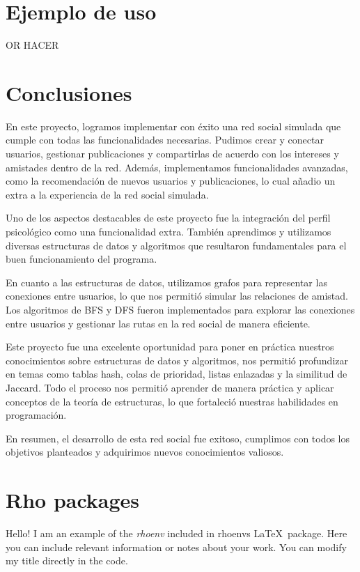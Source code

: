 \documentclass[9pt,letterpaper,onecolumn]{rho-class/rho}
\begin{document}
\newpage
\section{Ejemplo de uso}

    OR HACER

\newpage
\section{Conclusiones}

    En este proyecto, logramos implementar con éxito una red social simulada que cumple con todas las funcionalidades necesarias. Pudimos crear y conectar usuarios, gestionar publicaciones y compartirlas de acuerdo con los intereses y amistades dentro de la red. Además, implementamos funcionalidades avanzadas, como la recomendación de nuevos usuarios y publicaciones, lo cual añadio un extra a la experiencia de la red social simulada.

    Uno de los aspectos destacables de este proyecto fue la integración del perfil psicológico como una funcionalidad extra. También aprendimos y utilizamos diversas estructuras de datos y algoritmos que resultaron fundamentales para el buen funcionamiento del programa.

    En cuanto a las estructuras de datos, utilizamos grafos para representar las conexiones entre usuarios, lo que nos permitió simular las relaciones de amistad. Los algoritmos de BFS y DFS fueron implementados para explorar las conexiones entre usuarios y gestionar las rutas en la red social de manera eficiente.

    Este proyecto fue una excelente oportunidad para poner en práctica nuestros conocimientos sobre estructuras de datos y algoritmos, nos permitió profundizar en temas como tablas hash, colas de prioridad, listas enlazadas y la similitud de Jaccard. Todo el proceso nos permitió aprender de manera práctica y aplicar conceptos de la teoría de estructuras, lo que fortaleció nuestras habilidades en programación.

    En resumen, el desarrollo de esta red social fue exitoso, cumplimos con todos los objetivos planteados y adquirimos nuevos conocimientos valiosos.

\section{Rho packages}

        \begin{rhoenv}[frametitle=Environment with custom title]
            Hello! I am an example of the \textit{rhoenv} included in rhoenvs \LaTeX\ package. Here you can include relevant information or notes about your work. You can modify my title directly in the code.
        \end{rhoenv}
\end{document}
